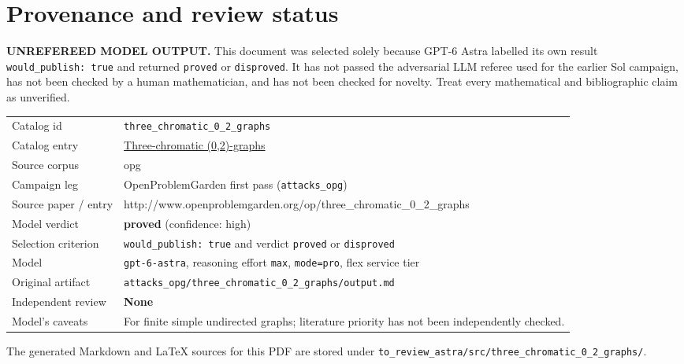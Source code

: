 \documentclass[
  11pt,
  a4paper,
]{article}
\newcounter{none} %
\begin{document}
\appendix

\section{Provenance and review
status}\label{provenance-and-review-status}

\begin{warning}

\textbf{UNREFEREED MODEL OUTPUT.} This document was selected solely
because GPT-6 Astra labelled its own result
\texttt{would\_publish:\ true} and returned \texttt{proved} or
\texttt{disproved}. It has not passed the adversarial LLM referee used
for the earlier Sol campaign, has not been checked by a human
mathematician, and has not been checked for novelty. Treat every
mathematical and bibliographic claim as unverified.

\end{warning}

{\def\LTcaptype{none} %
\begin{longtable}[]{@{}
  >{\raggedright\arraybackslash}p{}
  >{\raggedright\arraybackslash}p{}@{}}
\toprule\noalign{}
\endhead
\bottomrule\noalign{}
\endlastfoot
Catalog id & \texttt{three\_chromatic\_0\_2\_graphs} \\
Catalog entry &
\href{https://graph-theory-ai.github.io/graph-conjectures/op/three_chromatic_0_2_graphs/}{Three-chromatic
(0,2)-graphs} \\
Source corpus & opg \\
Campaign leg & OpenProblemGarden first pass (\texttt{attacks\_opg}) \\
Source paper / entry &
http://www.openproblemgarden.org/op/three\_chromatic\_0\_2\_graphs \\
Model verdict & \textbf{proved} (confidence: high) \\
Selection criterion & \texttt{would\_publish:\ true} and verdict
\texttt{proved} or \texttt{disproved} \\
Model & \texttt{gpt-6-astra}, reasoning effort \texttt{max},
\texttt{mode=pro}, flex service tier \\
Original artifact &
\texttt{attacks\_opg/three\_chromatic\_0\_2\_graphs/output.md} \\
Independent review & \textbf{None} \\
Model's caveats & For finite simple undirected graphs; literature
priority has not been independently checked. \\
\end{longtable}
}

The generated Markdown and LaTeX sources for this PDF are stored under
\texttt{to\_review\_astra/src/three\_chromatic\_0\_2\_graphs/}.
\end{document}
